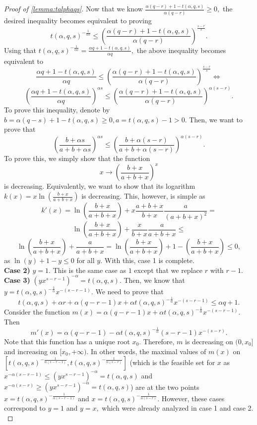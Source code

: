 \documentclass[11pt]{article}\usepackage{amsfonts}
\numberwithin{theorem}{subsection}
\begin{document}
\begin{proof}[Proof of \cref{lemma:talphaqs}]
\noindent
Now that we know $\frac{\alpha (q-r)+1 - t(\alpha,q,s)}{\alpha (q-r)}\ge 0,$ the desired inequality becomes equivalent to proving 
$$
t(\alpha,q,s)^{-\frac{1}{\alpha s}}
\le \left(\frac{\alpha (q-r)+1 - t(\alpha,q,s)}{\alpha (q-r)}\right)^\frac{s-r}{s}.
$$
Using that $t(\alpha,q,s)^{-\frac{1}{\alpha s}} = \frac{\alpha q + 1 - t(\alpha,q,s)}{\alpha q},$ the above inequality becomes equivalent to 
$$
\frac{\alpha q + 1 - t(\alpha,q,s)}{\alpha q}\le 
 \left(\frac{\alpha (q-r)+1 - t(\alpha,q,s)}{\alpha (q-r)}\right)^\frac{s-r}{s} \Longleftrightarrow
$$
$$
\left(
\frac{\alpha q + 1 - t(\alpha,q,s)}{\alpha q}
\right)^{\alpha s}\le 
 \left(\frac{\alpha (q-r)+1 - t(\alpha,q,s)}{\alpha (q-r)}\right)^{\alpha (s-r)}.
$$
To prove this inequality, denote by $b = \alpha(q-s)+1- t(\alpha,q,s)\ge 0, a = t(\alpha,q,s) - 1> 0.$ Then, we want to prove that 
$$
\left(
\frac{b + \alpha s}{a + b + \alpha s}
\right)^{\alpha s}\le 
\left(
\frac{b + \alpha (s-r)}{a + b + \alpha (s-r)}
\right)^{\alpha (s-r)}.
$$
To prove this, we simply show that the function $$
x\longrightarrow
\left(
\frac{b + x}{a + b + x}
\right)^{x}
$$
is decreasing. Equivalently, we want to show that its logarithm $k(x)  = x\ln \left(
\frac{b + x}{a + b + x}
\right)$ is decreasing. This, however, is simple as 
$$
k'(x) = 
\ln \left(
\frac{b + x}{a + b + x}
\right) + 
x \frac{a+b+x}{b+x}\frac{a}{(a+b+x)^2} = 
$$
$$
\ln \left(
\frac{b + x}{a + b + x}
\right) + 
\frac{x}{b+x}\frac{a}{a+b+x}\le 
$$
$$
\ln \left(
\frac{b + x}{a + b + x}
\right) + 
\frac{a}{a+b+x} = 
\ln \left(
\frac{b + x}{a + b + x}
\right) + 1 - 
\left(
\frac{b + x}{a + b + x}
\right)\le 0,
$$
as $\ln (y) + 1 - y\le 0 $ for all $y.$ With this, case 1 is complete.\\
\textbf{Case 2)} $y = 1.$ This is the same case as $1$ except that we replace $r$ with $r-1.$\\
\textbf{Case 3)} $(yx^{s-r-1})^{-\alpha} = t(\alpha, q, s).$ Then, we know that $y = t(\alpha, q, s)^{-\frac{1}{\alpha}}x^{-(s-r-1)}.$ We need to prove that 
$$
t(\alpha, q, s) + \alpha r + \alpha (q-r-1)x + \alpha t(\alpha, q, s)^{-\frac{1}{\alpha}}x^{-(s-r-1)}\le 
\alpha q + 1.
$$
Consider the function $m(x) = \alpha (q-r-1)x + \alpha t(\alpha, q, s)^{-\frac{1}{\alpha}}x^{-(s-r-1)}.$ Then
$$
m'(x) = 
\alpha (q-r-1) - 
\alpha t(\alpha, q, s)^{-\frac{1}{\alpha}}(s-r-1)x^{-(s-r)}.
$$
Note that this function has a unique root
$x_0.$ Therefore, $m$ is decreasing on $(0,x_0]$ and increasing on $[x_0, +\infty).$ In other words, the maximal values of $m(x)$ on $[t(\alpha,q,s)^{-\frac{1}{\alpha(s-r-1)}},t(\alpha,q,s)^{-\frac{1}{\alpha(s-r)}}]$ (which is the feasible set for $x$ as $x^{-\alpha(s-r-1)}\le (yx^{s-r-1})^{-\alpha}  = t(\alpha,q,s)$ and\linebreak $x^{-\alpha(s-r)}\ge (yx^{s-r-1})^{-\alpha}  = t(\alpha,q,s)$)
 are at the two points $x = t(\alpha,q,s)^{-\frac{1}{\alpha(s-r-1)}}$ and \linebreak $x = t(\alpha,q,s)^{-\frac{1}{\alpha(s-r)}}.$ However, these cases correspond to $y = 1$ and $y = x,$ which were already analyzed in case 1 and case 2.\\
 

\end{proof}
\end{document}
